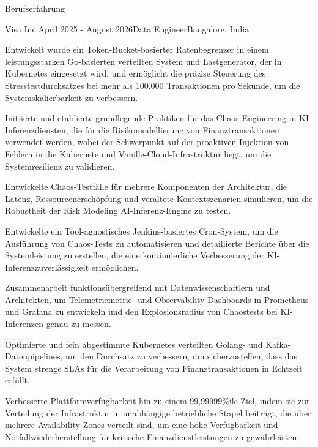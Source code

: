 \documentclass{resume} %
\begin{document}
\begin{rSection}{Berufserfahrung}

    \begin{rSubsection}{Visa Inc.}{April 2025 - August 2026}{Data Engineer}{Bangalore, India}
        \item Entwickelt wurde ein Token-Bucket-basierter Ratenbegrenzer in einem leistungsstarken Go-basierten verteilten System und Lastgenerator, der in Kubernetes eingesetzt wird, und ermöglicht die präzise Steuerung des Stresstestdurchsatzes bei mehr als 100.000 Transaktionen pro Sekunde, um die Systemskalierbarkeit zu verbessern.
        \item Initiierte und etablierte grundlegende Praktiken für das Chaos-Engineering in KI-Inferenzdiensten, die für die Risikomodellierung von Finanztransaktionen verwendet werden, wobei der Schwerpunkt auf der proaktiven Injektion von Fehlern in die Kubernete und Vanille-Cloud-Infrastruktur liegt, um die Systemresilienz zu validieren.
        \item Entwickelte Chaos-Testfälle für mehrere Komponenten der Architektur, die Latenz, Ressourcenerschöpfung und veraltete Kontextszenarien simulieren, um die Robustheit der Risk Modeling AI-Inferenz-Engine zu testen.
        \item Entwickelte ein Tool-agnostisches Jenkins-basiertes Cron-System, um die Ausführung von Chaos-Tests zu automatisieren und detaillierte Berichte über die Systemleistung zu erstellen, die eine kontinuierliche Verbesserung der KI-Inferenzzuverlässigkeit ermöglichen.
        \item Zusammenarbeit funktionsübergreifend mit Datenwissenschaftlern und Architekten, um Telemetriemetrie- und Observability-Dashboards in Prometheus und Grafana zu entwickeln und den Explosionsradius von Chaostests bei KI-Inferenzen genau zu messen.
        \item Optimierte und fein abgestimmte Kubernetes verteilten Golang- und Kafka-Datenpipelines, um den Durchsatz zu verbessern, um sicherzustellen, dass das System strenge SLAs für die Verarbeitung von Finanztransaktionen in Echtzeit erfüllt.                  
        \item Verbesserte Plattformverfügbarkeit hin zu einem 99,99999\%ile-Ziel, indem sie zur Verteilung der Infrastruktur in unabhängige betriebliche Stapel beiträgt, die über mehrere Availability Zones verteilt sind, um eine hohe Verfügbarkeit und Notfallwiederherstellung für kritische Finanzdienstleistungen zu gewährleisten.
    \end{rSubsection}
    

\end{rSection}
\end{document}
